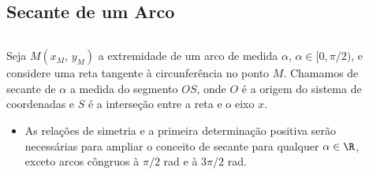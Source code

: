 \subsection{Secante de um Arco}
\begin{frame}
  \begin{columns}[onlytextwidth]
    \begin{column}{0.49\textwidth}\vspace{-0.5cm}
      \begin{definition}[Secante no 1ºQ]
        Seja $M(x_{M},\,y_{M})$ a extremidade de um arco de medida $\alpha$, $\alpha\in[0,\pi/2)$, e considere uma reta tangente à circunferência no ponto $M$. Chamamos de secante de $\alpha$ a medida do segmento $OS$, onde $O$ é a origem do sistema de coordenadas e $S$ é a interseção entre a reta e o eixo $x$.
      \end{definition}
      \begin{highlight}
        \begin{itemize}
          \item As relações de simetria e a primeira determinação positiva serão necessárias para ampliar o conceito de secante para qualquer $\alpha\in\R$, exceto arcos côngruos à $\pi/2$ rad e à $3\pi/2$ rad.
        \end{itemize}
      \end{highlight}
    \end{column}
    \begin{column}{0.49\textwidth}\vspace{-0.5cm}
      \begin{figure}
      \end{figure}
    \end{column}
  \end{columns}
\end{frame}

